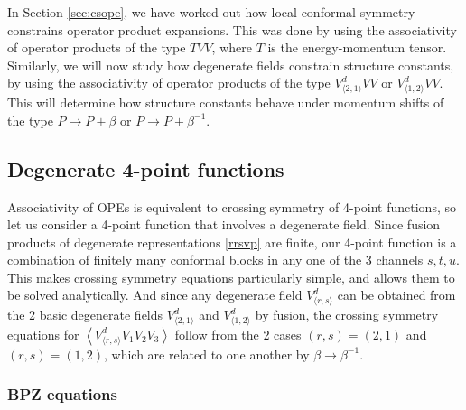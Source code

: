 \documentclass[12pt, a4paper]{article}
\begin{document}
In Section \ref{sec:csope}, we have worked out how local conformal symmetry constrains operator product expansions. This was done by using the associativity of operator products of the type $TVV$, where $T$ is the energy-momentum tensor. Similarly, we will now study how degenerate fields constrain structure constants, by using the associativity of 
operator products of the type $V^d_{\langle 2,1\rangle}VV$ or $V^d_{\langle 1,2\rangle}VV$.  
This will determine how structure constants behave under momentum shifts of the type $P\to P+ \beta$ or $P\to P+ \beta^{-1}$. 

\subsection{Degenerate 4-point functions}

Associativity of OPEs is equivalent to crossing symmetry of 4-point functions, so let us consider a 4-point function that involves a degenerate field. Since fusion products of degenerate representations \eqref{rrsvp} are finite, our 4-point function is a combination of finitely many conformal blocks in any one of the 3 channels $s,t,u$. This makes crossing symmetry equations particularly simple, and allows them to be solved analytically. 
And since any degenerate field $V^d_{\langle r,s\rangle}$ can be obtained from the 2 basic degenerate fields $V^d_{\langle 2,1\rangle}$ and $V^d_{\langle 1,2\rangle}$ by fusion, the crossing symmetry equations for $\left<V^d_{\langle r,s\rangle}V_1V_2V_3\right>$ follow from the 2 cases $(r,s)=(2,1)$ and $(r,s)=(1,2)$, which are related to one another by $\beta\to \beta^{-1}$.  

\subsubsection{BPZ equations}
\end{document}
